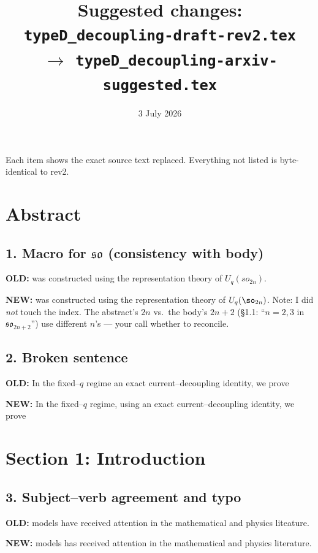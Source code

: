 \documentclass[11pt]{article}
\title{Suggested changes: \texttt{typeD\_decoupling-draft-rev2.tex}\\
$\to$ \texttt{typeD\_decoupling-arxiv-suggested.tex}}
\author{}
\date{3 July 2026}
\newenvironment{old}{\par\noindent\textcolor{oldred}{\textbf{OLD:}}\small\color{oldred}\verbatim}{\endverbatim\normalsize\color{black}}
\newenvironment{new}{\par\noindent\textcolor{newgreen}{\textbf{NEW:}}\small\color{newgreen}\verbatim}{\endverbatim\normalsize\color{black}}
\begin{document}
\maketitle

\noindent Each item shows the exact source text replaced. Everything not listed is
byte-identical to rev2.

\section*{Abstract}

\subsection*{1. Macro for $\mathfrak{so}$ (consistency with body)}
\begin{old}
was constructed using the representation theory of $U_q(so_{2n})$.
\end{old}
\begin{new}
was constructed using the representation theory of $U_q(\so_{2n})$.
\end{new}
Note: I did \emph{not} touch the index. The abstract's $2n$ vs.\ the body's
$2n+2$ (\S1.1: ``$n=2,3$ in $\mathfrak{so}_{2n+2}$'') use different $n$'s ---
your call whether to reconcile.

\subsection*{2. Broken sentence}
\begin{old}
In the fixed--$q$ regime an exact current--decoupling identity, we prove
\end{old}
\begin{new}
In the fixed--$q$ regime, using an exact current--decoupling identity, we prove
\end{new}

\section*{Section 1: Introduction}

\subsection*{3. Subject--verb agreement and typo}
\begin{old}
models have received attention in the mathematical and physics liteature.
\end{old}
\begin{new}
models has received attention in the mathematical and physics literature.
\end{new}
\end{document}
